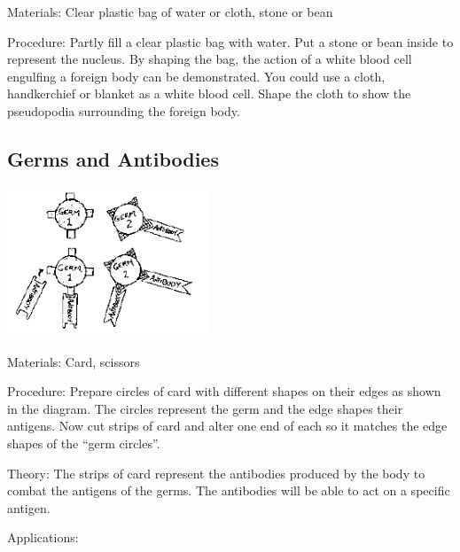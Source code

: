 \begin{multicols}{2}
\begin{description*}
\item[Materials:]{Clear plastic bag of water or cloth, stone or bean}
\item[Procedure:]{Partly fill a clear plastic bag with
water. Put a stone or bean inside
to represent the nucleus. By
shaping the bag, the action of a
white blood cell engulfing a
foreign body can be
demonstrated. You could use a
cloth, handkerchief or blanket as
a white blood cell. Shape the
cloth to show the pseudopodia
surrounding the foreign body.}
\end{description*}

\columnbreak

\subsection{Germs and Antibodies} %

\begin{center}
\includegraphics[width=0.45\textwidth]{./img/source/antibodies-2.png}
\end{center}

\begin{description*}
\item[Materials:]{Card, scissors}
\item[Procedure:]{Prepare circles of card with different shapes on their edges as shown in the diagram. The
circles represent the germ and the edge shapes their antigens. Now cut strips of card and
alter one end of each so it matches the edge shapes of the ``germ circles''.}
\item[Theory:]{The strips of card represent the antibodies produced by the body to combat the antigens of
the germs. The antibodies will be able to act on a specific antigen.}
\item[Applications:]{}
\end{description*}


\end{multicols}
